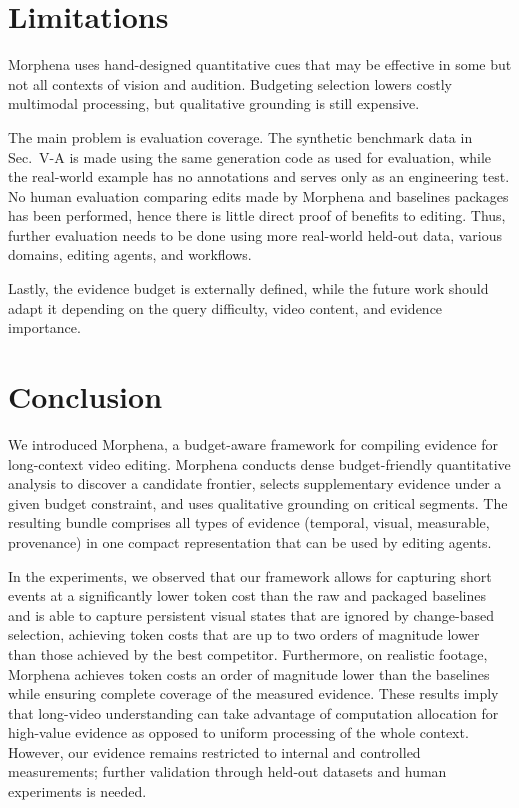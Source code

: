 \documentclass[conference]{IEEEtran}
\begin{document}
\section{Limitations}
\label{sec:limitations}

Morphena uses hand-designed quantitative cues that may be effective in some but not all contexts of vision and audition. Budgeting selection lowers costly multimodal processing, but qualitative grounding is still expensive.

The main problem is evaluation coverage. The synthetic benchmark data in Sec.~V-A is made using the same generation code as used for evaluation, while the real-world example has no annotations and serves only as an engineering test. No human evaluation comparing edits made by Morphena and baselines packages has been performed, hence there is little direct proof of benefits to editing. Thus, further evaluation needs to be done using more real-world held-out data, various domains, editing agents, and workflows.

Lastly, the evidence budget is externally defined, while the future work should adapt it depending on the query difficulty, video content, and evidence importance.

\section{Conclusion}
We introduced Morphena, a budget-aware framework for compiling evidence for long-context video editing. Morphena conducts dense budget-friendly quantitative analysis to discover a candidate frontier, selects supplementary evidence under a given budget constraint, and uses qualitative grounding on critical segments. The resulting bundle comprises all types of evidence (temporal, visual, measurable, provenance) in one compact representation that can be used by editing agents.

In the experiments, we observed that our framework allows for capturing short events at a significantly lower token cost than the raw and packaged baselines and is able to capture persistent visual states that are ignored by change-based selection, achieving token costs that are up to two orders of magnitude lower than those achieved by the best competitor. Furthermore, on realistic footage, Morphena achieves token costs an order of magnitude lower than the baselines while ensuring complete coverage of the measured evidence. These results imply that long-video understanding can take advantage of computation allocation for high-value evidence as opposed to uniform processing of the whole context. However, our evidence remains restricted to internal and controlled measurements; further validation through held-out datasets and human experiments is needed.




\end{document}
